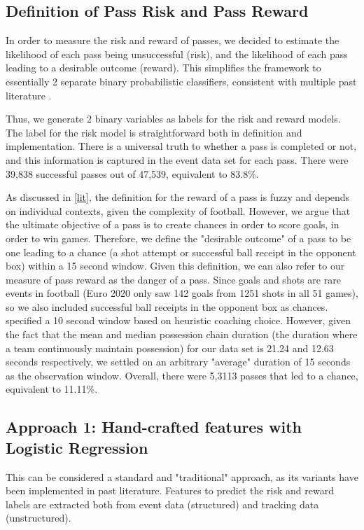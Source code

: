 \documentclass[conference]{IEEEtran}
\begin{document}
\subsection{Definition of Pass Risk and Pass Reward}\label{riskreward}

In order to measure the risk and reward of passes, we decided to estimate the likelihood of each pass being unsuccessful (risk), and the likelihood of each pass leading to a desirable outcome (reward). This simplifies the framework to essentially 2 separate binary probabilistic classifiers, consistent with multiple past literature \parencite{riskrewardpower, xPass2022, goesriskreward}. 

Thus, we generate 2 binary variables as labels for the risk and reward models. The label for the risk model is straightforward both in definition and implementation. There is a universal truth to whether a pass is completed or not, and this information is captured in the event data set for each pass. There were 39,838 successful passes out of 47,539, equivalent to 83.8\%.

As discussed in \ref{lit}, the definition for the reward of a pass is fuzzy and depends on individual contexts, given the complexity of football. However, we argue that the ultimate objective of a pass is to create chances in order to score goals, in order to win games. Therefore, we define the "desirable outcome" of a pass to be one leading to a chance (a shot attempt or successful ball receipt in the opponent box) within a 15 second window. Given this definition, we can also refer to our measure of pass reward as the danger of a pass. Since goals and shots are rare events in football (Euro 2020 only saw 142 goals from 1251 shots in all 51 games), so we also included successful ball receipts in the opponent box as chances. \textcite{riskrewardpower} specified a 10 second window based on heuristic coaching choice. However, given the fact that the mean and median possession chain duration (the duration where a team continuously maintain possession) for our data set is 21.24 and 12.63 seconds respectively, we settled on an arbitrary "average" duration of 15 seconds as the observation window. Overall, there were 5,3113 passes that led to a chance, equivalent to 11.11\%.




\subsection{Approach 1: Hand-crafted features with Logistic Regression}\label{methodlog}
This can be considered a standard and "traditional" approach, as its variants have been implemented in past literature. Features to predict the risk and reward labels are extracted both from event data (structured) and tracking data (unstructured). 
\end{document}
